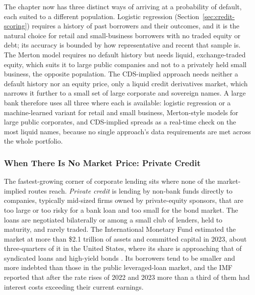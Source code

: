 \documentclass[../ai_in_finance]{subfiles}
\begin{document}
The chapter now has three distinct ways of arriving at a probability of default, each suited to a different population. Logistic regression (Section~\ref{sec:credit-scoring}) requires a history of past borrowers and their outcomes, and it is the natural choice for retail and small-business borrowers with no traded equity or debt; its accuracy is bounded by how representative and recent that sample is.
The Merton model requires no default history but needs liquid, exchange-traded equity, which suits it to large public companies and not to a privately held small business, the opposite population.
The CDS-implied approach needs neither a default history nor an equity price, only a liquid credit derivatives market, which narrows it further to a small set of large corporate and sovereign names.
A large bank therefore uses all three where each is available: logistic regression or a machine-learned variant for retail and small business, Merton-style models for large public corporates, and CDS-implied spreads as a real-time check on the most liquid names, because no single approach's data requirements are met across the whole portfolio.

\subsubsection*{When There Is No Market Price: Private Credit}

The fastest-growing corner of corporate lending sits where none of the market-implied routes reach. \emph{Private credit} is lending by non-bank funds directly to companies, typically mid-sized firms owned by private-equity sponsors, that are too large or too risky for a bank loan and too small for the bond market. The loans are negotiated bilaterally or among a small club of lenders, held to maturity, and rarely traded. The International Monetary Fund estimated the market at more than \$2.1 trillion of assets and committed capital in 2023, about three-quarters of it in the United States, where its share is approaching that of syndicated loans and high-yield bonds \parencite{imf2024gfsr}. Its borrowers tend to be smaller and more indebted than those in the public leveraged-loan market, and the IMF reported that after the rate rises of 2022 and 2023 more than a third of them had interest costs exceeding their current earnings.
\end{document}

